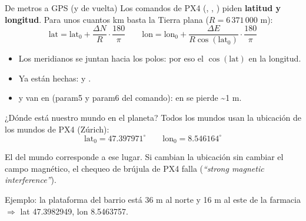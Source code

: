 \begin{frame}{De metros a GPS (y de vuelta)}
  \small Los comandos de PX4 (, , ) piden
  \textbf{latitud y longitud}. Para unos cuantos km basta la Tierra plana ($R = 6\,371\,000$ m):
  \[
    \text{lat} = \text{lat}_0 + \frac{\Delta N}{R}\cdot\frac{180}{\pi}
    \qquad
    \text{lon} = \text{lon}_0 + \frac{\Delta E}{R\cos(\text{lat}_0)}\cdot\frac{180}{\pi}
  \]
  \begin{itemize}
    \item Los meridianos se juntan hacia los polos: por eso el $\cos(\text{lat})$ en la longitud.
    \item Ya están hechas:  y .
    \item {} y  van en  (param5 y param6 del comando): en
       se pierde \textasciitilde1 m.
  \end{itemize}
\end{frame}

\begin{frame}{¿Dónde está nuestro mundo en el planeta?}
  \small Todos los mundos usan la ubicación de los mundos de PX4 (Zúrich):
  \[ \text{lat}_0 = 47.397971^\circ \qquad \text{lon}_0 = 8.546164^\circ \]
  \begin{ojo}
    \small El  del mundo corresponde a ese lugar. Si cambian la ubicación sin
    cambiar el campo magnético, el chequeo de brújula de PX4 falla
    (\emph{``strong magnetic interference''}).
  \end{ojo}
  \vspace{0.3em}
  Ejemplo: la plataforma del barrio está 36 m al norte y 16 m al este de la farmacia
  $\Rightarrow$ lat 47.3982949, lon 8.5463757.
\end{frame}
